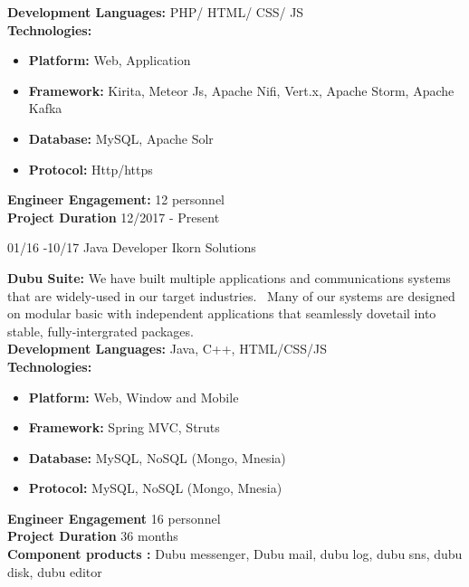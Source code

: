 \documentclass[]{friggeri-cv}
\begin{document}
\begin{entrylist}
\entry
{}
{}
{}
	{ \textbf{Development Languages:} PHP/ HTML/ CSS/ JS~\\
	 \textbf{Technologies:}~
			\begin{itemize}
				\item \textbf{Platform:}  Web, Application
				\item \textbf{Framework:} Kirita, Meteor Js, Apache Nifi,  Vert.x, Apache Storm, Apache Kafka  
				\item \textbf{Database:} MySQL, Apache Solr
				\item \textbf{Protocol:} Http/https
			\end{itemize}
	 \textbf{Engineer Engagement:} 12 personnel\\
	 \textbf{Project Duration} 12/2017 - Present~
	}
\end{entrylist}

\begin{entrylist}
  \entry
    {01/16 -10/17}
    {Java Developer}
    {Ikorn Solutions}
   {\textbf{Dubu Suite:} We have built multiple applications and communications systems that are widely-used in our target industries.~
	 Many of our systems are designed on modular basic with independent applications that seamlessly dovetail into stable, fully-intergrated packages.\\

	 \textbf{Development Languages:} Java, C++, HTML/CSS/JS\\
	 \textbf{Technologies:}~
			\begin{itemize}
				\item \textbf{Platform:} Web, Window and Mobile
				\item \textbf{Framework:} Spring MVC, Struts
				\item \textbf{Database:} MySQL, NoSQL (Mongo, Mnesia)
				\item \textbf{Protocol:} MySQL, NoSQL (Mongo, Mnesia)
			\end{itemize}
		 \textbf{Engineer Engagement} 16 personnel\\
		 \textbf{Project Duration} 36 months\\
		 \textbf{Component products :} Dubu messenger, Dubu mail, dubu log, dubu sns, dubu disk, dubu editor\\
}
\end{entrylist}
\end{document}
